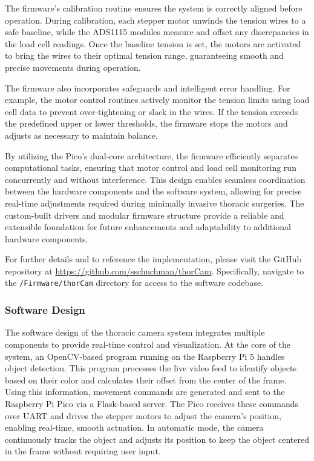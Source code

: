 The firmware's calibration routine ensures the system is correctly aligned before operation. During calibration, each stepper motor unwinds the tension wires to a safe baseline, while the ADS1115 modules measure and offset any discrepancies in the load cell readings. Once the baseline tension is set, the motors are activated to bring the wires to their optimal tension range, guaranteeing smooth and precise movements during operation.

The firmware also incorporates safeguards and intelligent error handling. For example, the motor control routines actively monitor the tension limits using load cell data to prevent over-tightening or slack in the wires. If the tension exceeds the predefined upper or lower thresholds, the firmware stops the motors and adjusts as necessary to maintain balance.

By utilizing the Pico's dual-core architecture, the firmware efficiently separates computational tasks, ensuring that motor control and load cell monitoring run concurrently and without interference. This design enables seamless coordination between the hardware components and the software system, allowing for precise real-time adjustments required during minimally invasive thoracic surgeries. The custom-built drivers and modular firmware structure provide a reliable and extensible foundation for future enhancements and adaptability to additional hardware components.

For further details and to reference the implementation, please visit the GitHub repository at \url{https://github.com/sschuchman/thorCam}. Specifically, navigate to the \texttt{/Firmware/thorCam} directory for access to the software codebase.

\subsubsection{Software Design}
The software design of the thoracic camera system integrates multiple components to provide real-time control and visualization. At the core of the system, an OpenCV-based program running on the Raspberry Pi 5 handles object detection. This program processes the live video feed to identify objects based on their color and calculates their offset from the center of the frame. Using this information, movement commands are generated and sent to the Raspberry Pi Pico via a Flask-based server. The Pico receives these commands over UART and drives the stepper motors to adjust the camera's position, enabling real-time, smooth actuation. In automatic mode, the camera continuously tracks the object and adjusts its position to keep the object centered in the frame without requiring user input.

